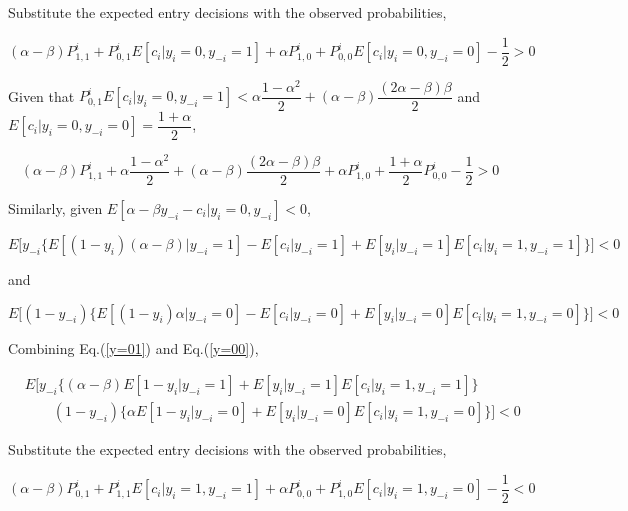 \documentclass[draft]{article}
\begin{document}
Substitute the expected entry decisions with the observed probabilities, 

\begin{equation}
    (\alpha - \beta)P^i_{1,1} + P^i_{0,1}E[c_i|y_i = 0, y_{-i} = 1] + \alpha P^i_{1,0} + P^i_{0,0}E[c_i|y_i = 0, y_{-i} = 0] - \dfrac{1}{2} > 0
\end{equation}

Given that $P^i_{0,1}E[c_i|y_i = 0, y_{-i} = 1] < \alpha\dfrac{1 - \alpha^2}{2} + (\alpha- \beta)\dfrac{(2\alpha - \beta)\beta}{2}$ and $E[c_i|y_i = 0, y_{-i} = 0] = \dfrac{1 + \alpha}{2}$,

\begin{equation}
    (\alpha - \beta)P^i_{1,1} + \alpha\dfrac{1 - \alpha^2}{2} + (\alpha- \beta)\dfrac{(2\alpha - \beta)\beta}{2} + \alpha P^i_{1,0} + \dfrac{1 + \alpha}{2}P^i_{0,0} - \dfrac{1}{2} > 0
    \label{y1=1}
\end{equation}

Similarly, given $E[\alpha - \beta y_{-i} - c_i|y_i = 0, y_{-i}] < 0$, 

\begin{equation}
    E\Bigg[y_{-i}\Big\{E[(1 - y_i)(\alpha - \beta) | y_{-i} = 1] - E[c_i | y_{-i} = 1] + E[y_i|y_{-i} = 1]E[c_i|y_i = 1, y_{-i} = 1]\Big\}\Bigg] < 0
    \label{y=01}
\end{equation}

and 

\begin{equation}
    E\Bigg[(1 - y_{-i})\Big\{
    E[(1 - y_i)\alpha| y_{-i} = 0] - E[c_i | y_{-i} = 0] + E[y_i|y_{-i} = 0]E[c_i|y_i = 1, y_{-i} = 0] \Big\}\Bigg] < 0 
    \label{y=00}
\end{equation}

Combining Eq.(\ref{y=01}) and Eq.(\ref{y=00}),


\begin{equation}
    \begin{array}{rl}
    &E\Bigg[y_{-i}\Big\{(\alpha - \beta) E[1 - y_i| y_{-i} = 1] + E[y_i|y_{-i} = 1]E[c_i|y_i = 1, y_{-i} = 1]\Big\}\\
    & \qquad (1 - y_{-i})\Big\{
    \alpha E[1 - y_i| y_{-i} = 0]  + E[y_i|y_{-i} = 0]E[c_i|y_i = 1, y_{-i} = 0] \Big\} \Bigg] < 0 
    \end{array}
\end{equation}

Substitute the expected entry decisions with the observed probabilities, 

\begin{equation}
    (\alpha - \beta)P^i_{0,1} + P^i_{1,1}E[c_i|y_i = 1, y_{-i} = 1] + \alpha P^i_{0,0} + P^i_{1,0}E[c_i|y_i = 1, y_{-i} = 0] - \dfrac{1}{2} < 0
    \label{y1=0}
\end{equation}
\end{document}
